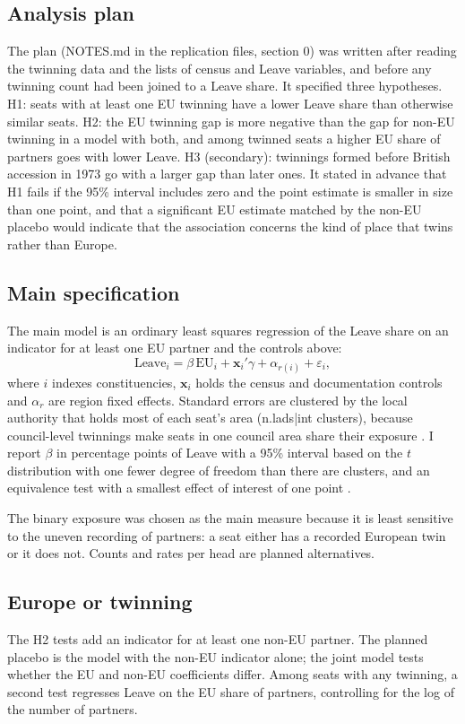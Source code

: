 \documentclass[11pt,a4paper]{article}
\begin{document}
\subsection{Analysis plan}
The plan (NOTES.md in the replication files, section 0) was written after reading the twinning data and the lists of census and Leave variables, and before any twinning count had been joined to a Leave share. It specified three hypotheses. H1: seats with at least one EU twinning have a lower Leave share than otherwise similar seats. H2: the EU twinning gap is more negative than the gap for non-EU twinning in a model with both, and among twinned seats a higher EU share of partners goes with lower Leave. H3 (secondary): twinnings formed before British accession in 1973 go with a larger gap than later ones. It stated in advance that H1 fails if the 95\% interval includes zero and the point estimate is smaller in size than one point, and that a significant EU estimate matched by the non-EU placebo would indicate that the association concerns the kind of place that twins rather than Europe.

\subsection{Main specification}
The main model is an ordinary least squares regression of the Leave share on an indicator for at least one EU partner and the controls above:
\begin{equation}
\text{Leave}_{i} = \beta\,\text{EU}_{i} + \mathbf{x}_{i}'\gamma + \alpha_{r(i)} + \varepsilon_{i},
\end{equation}
where $i$ indexes constituencies, $\mathbf{x}_i$ holds the census and documentation controls and $\alpha_r$ are region fixed effects. Standard errors are clustered by the local authority that holds most of each seat's area ({{n.lads|int}} clusters), because council-level twinnings make seats in one council area share their exposure \citep{cameron2015}. I report $\beta$ in percentage points of Leave with a 95\% interval based on the $t$ distribution with one fewer degree of freedom than there are clusters, and an equivalence test with a smallest effect of interest of one point \citep{lakens2017}.

The binary exposure was chosen as the main measure because it is least sensitive to the uneven recording of partners: a seat either has a recorded European twin or it does not. Counts and rates per head are planned alternatives.

\subsection{Europe or twinning}
The H2 tests add an indicator for at least one non-EU partner. The planned placebo is the model with the non-EU indicator alone; the joint model tests whether the EU and non-EU coefficients differ. Among seats with any twinning, a second test regresses Leave on the EU share of partners, controlling for the log of the number of partners.
\end{document}
